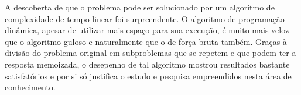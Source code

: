 \documentclass[a4paper,12pt,titlepage]{article}
\begin{document}
A descoberta de que o problema pode ser solucionado por um algoritmo de complexidade de tempo linear foi surpreendente. O algoritmo de programação dinâmica, apesar de utilizar mais espaço para sua execução, é muito mais veloz que o algoritmo guloso e naturalmente que o de força-bruta também. Graças à divisão do problema original em subproblemas que se repetem e que podem ter a resposta memoizada, o desepenho de tal algoritmo mostrou resultados bastante satisfatórios e por si só justifica o estudo e pesquisa empreendidos nesta área de conhecimento.

\begin{comment}
\begin{figure}[H]
     \centering
     \caption{}
     \label{bsp}
\end{figure}
\end{comment}


\newpage
\end{document}
